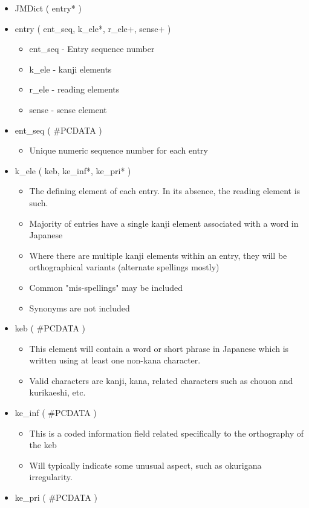 \documentclass[11pt]{article}
\begin{document}
\begin{itemize}
\item JMDict ( entry* )
\item entry ( ent\_seq, k\_ele*, r\_ele+, sense+ )
\begin{itemize}
\item ent\_seq - Entry sequence number
\item k\_ele - kanji elements
\item r\_ele - reading elements
\item sense - sense element
\end{itemize}
\item ent\_seq ( \#PCDATA )
\begin{itemize}
\item Unique numeric sequence number for each entry
\end{itemize}
\item k\_ele ( keb, ke\_inf*, ke\_pri* )
\begin{itemize}
\item The defining element of each entry. In its absence, the reading element is such.
\item Majority of entries have a single kanji element associated with a word in Japanese
\item Where there are multiple kanji elements within an entry, they will be orthographical variants (alternate spellings mostly)
\item Common "mis-spellings" may be included
\item Synonyms are not included
\end{itemize}
\item keb ( \#PCDATA )
\begin{itemize}
\item This element will contain a word or short phrase in Japanese which is written using at least one non-kana character.
\item Valid characters are kanji, kana, related characters such as chouon and kurikaeshi, etc.
\end{itemize}
\item ke\_inf ( \#PCDATA )
\begin{itemize}
\item This is a coded information field related specifically to the orthography of the keb
\item Will typically indicate some unusual aspect, such as okurigana irregularity.
\end{itemize}
\item ke\_pri ( \#PCDATA )

\end{itemize}
\end{document}
